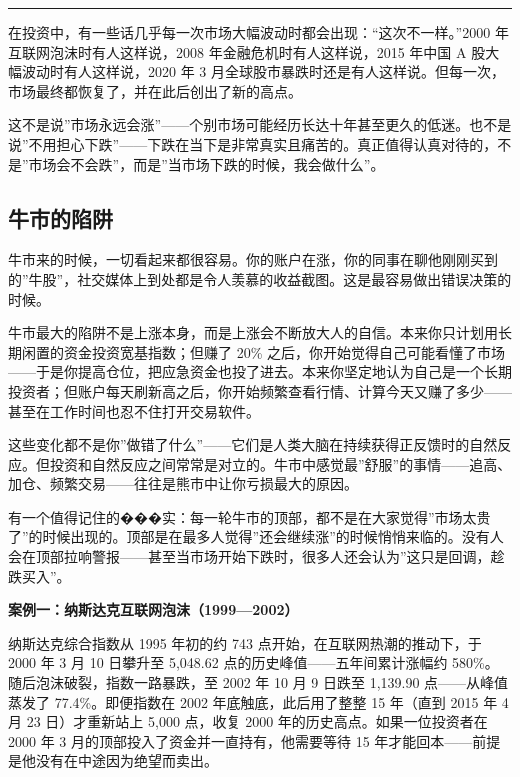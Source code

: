 \documentclass[a4paper,11pt,oneside,fontset=none,UTF8,zihao=-4]{ctexbook}
\begin{document}
\begin{center}{\color{dh-bronze}\rule{0.2\textwidth}{0.5pt}}\end{center}

在投资中，有一些话几乎每一次市场大幅波动时都会出现：``这次不一样。''2000
年互联网泡沫时有人这样说，2008 年金融危机时有人这样说，2015 年中国 A
股大幅波动时有人这样说，2020 年 3
月全球股市暴跌时还是有人这样说。但每一次，市场最终都恢复了，并在此后创出了新的高点。

这不是说''市场永远会涨''------个别市场可能经历长达十年甚至更久的低迷。也不是说''不用担心下跌''------下跌在当下是非常真实且痛苦的。真正值得认真对待的，不是''市场会不会跌''，而是''当市场下跌的时候，我会做什么''。

\subsection{牛市的陷阱}\label{ux725bux5e02ux7684ux9677ux9631}

牛市来的时候，一切看起来都很容易。你的账户在涨，你的同事在聊他刚刚买到的''牛股''，社交媒体上到处都是令人羡慕的收益截图。这是最容易做出错误决策的时候。

牛市最大的陷阱不是上涨本身，而是上涨会不断放大人的自信。本来你只计划用长期闲置的资金投资宽基指数；但赚了
20\%
之后，你开始觉得自己可能看懂了市场------于是你提高仓位，把应急资金也投了进去。本来你坚定地认为自己是一个长期投资者；但账户每天刷新高之后，你开始频繁查看行情、计算今天又赚了多少------甚至在工作时间也忍不住打开交易软件。

这些变化都不是你''做错了什么''------它们是人类大脑在持续获得正反馈时的自然反应。但投资和自然反应之间常常是对立的。牛市中感觉最''舒服''的事情------追高、加仓、频繁交易------往往是熊市中让你亏损最大的原因。

有一个值得记住的���实：每一轮牛市的顶部，都不是在大家觉得''市场太贵了''的时候出现的。顶部是在最多人觉得''还会继续涨''的时候悄悄来临的。没有人会在顶部拉响警报------甚至当市场开始下跌时，很多人还会认为''这只是回调，趁跌买入''。

\textbf{案例一：纳斯达克互联网泡沫（1999---2002）}

纳斯达克综合指数从 1995 年初的约 743 点开始，在互联网热潮的推动下，于
2000 年 3 月 10 日攀升至 5,048.62 点的历史峰值------五年间累计涨幅约
580\%。随后泡沫破裂，指数一路暴跌，至 2002 年 10 月 9 日跌至 1,139.90
点------从峰值蒸发了 77.4\%。即便指数在 2002 年底触底，此后用了整整 15
年（直到 2015 年 4 月 23 日）才重新站上 5,000 点，收复 2000
年的历史高点。如果一位投资者在 2000 年 3
月的顶部投入了资金并一直持有，他需要等待 15
年才能回本------前提是他没有在中途因为绝望而卖出。
\end{document}
